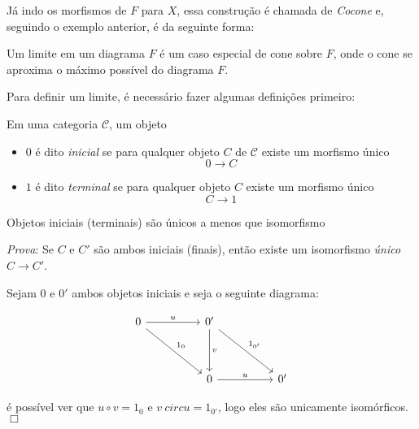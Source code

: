 \documentclass[../main.tex]{subfiles}
\begin{document}
Já indo os morfismos de $F$ para $X$, essa construção é chamada de \emph{Cocone} e, seguindo o exemplo anterior, é da seguinte forma:



Um limite em um diagrama $F$ é um caso especial de cone sobre $F$, onde o cone se aproxima o máximo possível do diagrama $F$.

Para definir um limite, é necessário fazer algumas definições primeiro:

\begin{definition}
    Em uma categoria $\mathcal{C}$, um objeto
    \begin{itemize}
        \item $0$ é dito \emph{inicial} se para qualquer objeto $C$ de $\mathcal{C}$ existe um morfismo único $$0 \to C$$
        \item $1$ é dito \emph{terminal} se para qualquer objeto $C$ existe um morfismo único $$C \to 1$$
    \end{itemize}
\end{definition}

\begin{proposition}
    Objetos iniciais (terminais) são únicos a menos que isomorfismo
\end{proposition}

\emph{Prova}: Se $C$ e $C'$ são ambos iniciais (finais), então existe um isomorfismo \emph{único} $C \to C'$.

Sejam $0$ e $0'$ ambos objetos iniciais e seja o seguinte diagrama:

\[\begin{tikzcd}
	0 && {0'} \\
	\\
	&& 0 && {0'}
	\arrow["u", from=1-1, to=1-3]
	\arrow["{1_{0}}", from=1-1, to=3-3]
	\arrow["v", from=1-3, to=3-3]
	\arrow["{1_{0'}}", from=1-3, to=3-5]
	\arrow["u", from=3-3, to=3-5]
\end{tikzcd}\]

é possível ver que $u \circ v = 1_0$ e $v \ circ u = 1_{0'}$, logo eles são unicamente isomórficos. $\Box $
 
\end{document}

